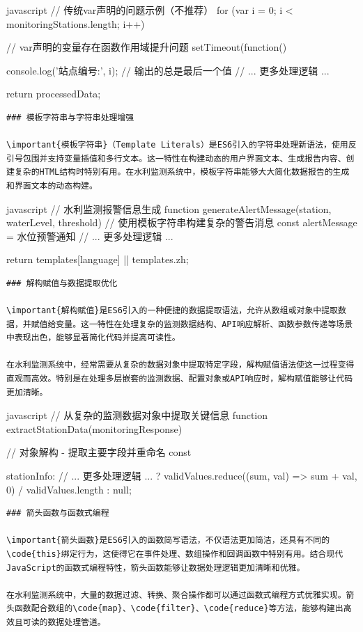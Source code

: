 {\begin{lstlisting}
\end{lstlisting}javascript
// 传统var声明的问题示例（不推荐）
for (var i = 0; i < monitoringStations.length; i++) {
    // var声明的变量存在函数作用域提升问题
    setTimeout(function() {
        console.log('站点编号:', i); // 输出的总是最后一个值
    // ... 更多处理逻辑 ...
    
    return processedData;
}
\begin{lstlisting}
### 模板字符串与字符串处理增强

\important{模板字符串}（Template Literals）是ES6引入的字符串处理新语法，使用反引号包围并支持变量插值和多行文本。这一特性在构建动态的用户界面文本、生成报告内容、创建复杂的HTML结构时特别有用。在水利监测系统中，模板字符串能够大大简化数据报告的生成和界面文本的动态构建。

\end{lstlisting}javascript
// 水利监测报警信息生成
function generateAlertMessage(station, waterLevel, threshold) {
    // 使用模板字符串构建复杂的警告消息
    const alertMessage = }
 水位预警通知 
    // ... 更多处理逻辑 ...
    
    return templates[language] || templates.zh;
}
\begin{lstlisting}
### 解构赋值与数据提取优化

\important{解构赋值}是ES6引入的一种便捷的数据提取语法，允许从数组或对象中提取数据，并赋值给变量。这一特性在处理复杂的监测数据结构、API响应解析、函数参数传递等场景中表现出色，能够显著简化代码并提高可读性。

在水利监测系统中，经常需要从复杂的数据对象中提取特定字段，解构赋值语法使这一过程变得直观而高效。特别是在处理多层嵌套的监测数据、配置对象或API响应时，解构赋值能够让代码更加清晰。

\end{lstlisting}javascript
// 从复杂的监测数据对象中提取关键信息
function extractStationData(monitoringResponse) {
    // 对象解构 - 提取主要字段并重命名
    const {
        stationInfo: {
    // ... 更多处理逻辑 ...
        ? validValues.reduce((sum, val) => sum + val, 0) / validValues.length
        : null;
}
\begin{lstlisting}
### 箭头函数与函数式编程

\important{箭头函数}是ES6引入的函数简写语法，不仅语法更加简洁，还具有不同的\code{this}绑定行为，这使得它在事件处理、数组操作和回调函数中特别有用。结合现代JavaScript的函数式编程特性，箭头函数能够让数据处理逻辑更加清晰和优雅。

在水利监测系统中，大量的数据过滤、转换、聚合操作都可以通过函数式编程方式优雅实现。箭头函数配合数组的\code{map}、\code{filter}、\code{reduce}等方法，能够构建出高效且可读的数据处理管道。


\end{lstlisting}}}}
